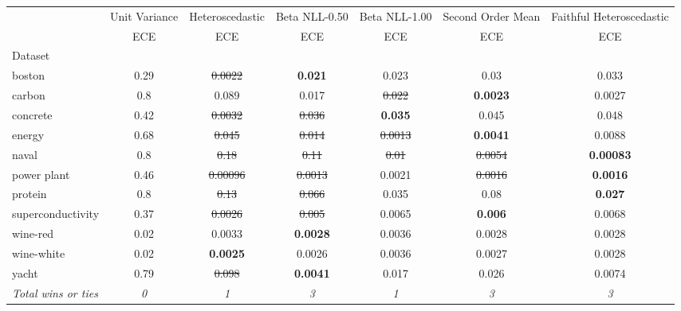 \begin{tabular}{l|c|c|c|c|c|c}
\toprule
{} & {Unit Variance} & {Heteroscedastic} & {Beta NLL-0.50} & {Beta NLL-1.00} & {Second Order Mean} & {Faithful Heteroscedastic} \\
{} & {ECE} & {ECE} & {ECE} & {ECE} & {ECE} & {ECE} \\
{Dataset} & {} & {} & {} & {} & {} & {} \\
\midrule
boston & 0.29 & \sout{0.0022} & \textbf{0.021} & 0.023 & 0.03 & 0.033 \\
carbon & 0.8 & 0.089 & 0.017 & \sout{0.022} & \textbf{0.0023} & 0.0027 \\
concrete & 0.42 & \sout{0.0032} & \sout{0.036} & \textbf{0.035} & 0.045 & 0.048 \\
energy & 0.68 & \sout{0.045} & \sout{0.014} & \sout{0.0013} & \textbf{0.0041} & 0.0088 \\
naval & 0.8 & \sout{0.18} & \sout{0.11} & \sout{0.01} & \sout{0.0054} & \textbf{0.00083} \\
power plant & 0.46 & \sout{0.00096} & \sout{0.0013} & 0.0021 & \sout{0.0016} & \textbf{0.0016} \\
protein & 0.8 & \sout{0.13} & \sout{0.066} & 0.035 & 0.08 & \textbf{0.027} \\
superconductivity & 0.37 & \sout{0.0026} & \sout{0.005} & 0.0065 & \textbf{0.006} & 0.0068 \\
wine-red & 0.02 & 0.0033 & \textbf{0.0028} & 0.0036 & 0.0028 & 0.0028 \\
wine-white & 0.02 & \textbf{0.0025} & 0.0026 & 0.0036 & 0.0027 & 0.0028 \\
yacht & 0.79 & \sout{0.098} & \textbf{0.0041} & 0.017 & 0.026 & 0.0074 \\
\textit{{Total wins or ties}} & \textit{0} & \textit{1} & \textit{3} & \textit{1} & \textit{3} & \textit{3} \\
\bottomrule
\end{tabular}
